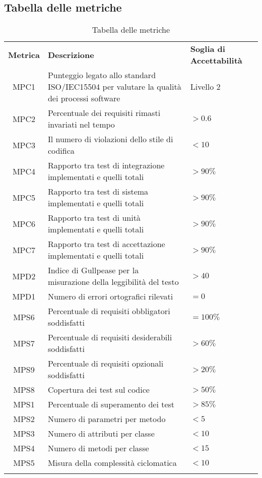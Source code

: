 \newpage

\subsection{Tabella delle metriche}

\begin{longtable}{| c | p{8cm} | p{2.5cm} |}
	\rowcolor{LightBlue}
	\color{white}\bfseries Metrica & \color{white}\bfseries Descrizione &\color{white}\bfseries Soglia di \newline Accettabilità \\
	MPC1 & Punteggio legato allo standard ISO/IEC15504 per valutare la qualità dei processi software & Livello 2 \\ \hline
	MPC2 & Percentuale dei requisiti rimasti invariati nel tempo & $> 0.6$ \\ \hline
	MPC3 & Il numero di violazioni dello stile di codifica & $< 10$ \\ \hline
	MPC4 & Rapporto tra test di integrazione implementati e quelli totali & $> 90\%$\\ \hline
	MPC5 & Rapporto tra test di sistema implementati e quelli totali & $> 90\%$\\ \hline
	MPC6 & Rapporto tra test di unità implementati e quelli totali & $> 90\%$\\ \hline
	MPC7 & Rapporto tra test di accettazione implementati e quelli totali & $> 90\%$\\ \hline
	MPD2 & Indice di Gullpease per la misurazione della leggibilità del testo & $> 40$\\ \hline
	MPD1 & Numero di errori ortografici rilevati & $= 0$\\ \hline
	MPS6 & Percentuale di requisiti obbligatori soddisfatti & $= 100\%$\\ \hline
	MPS7 & Percentuale di requisiti desiderabili soddisfatti & $> 60\%$\\ \hline
	MPS9 & Percentuale di requisiti opzionali soddisfatti & $> 20\%$\\ \hline
	MPS8 & Copertura dei test sul codice & $> 50\%$\\ \hline
	MPS1 & Percentuale di superamento dei test & $> 85\%$\\ \hline
	MPS2 & Numero di parametri per metodo & $< 5$\\ \hline
	MPS3 & Numero di attributi per classe & $< 10$\\ \hline
	MPS4 & Numero di metodi per classe & $< 15$\\ \hline
	MPS5 & Misura della complessità ciclomatica & $< 10$ \\ \hline
	\caption{Tabella delle metriche}
\end{longtable}


